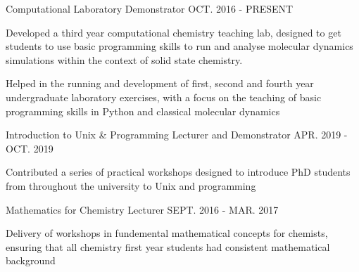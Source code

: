 \begin{cventries}
	\cventry
	{Computational Laboratory Demonstrator}
	{}
	{}
	{OCT. 2016 - PRESENT}
	{
		\begin{cvitems}
			\item {Developed a third year computational chemistry teaching lab, designed to get students to use basic programming skills to run and analyse molecular dynamics simulations within the context of solid state chemistry.}
			\item {Helped in the running and development of first, second and fourth year undergraduate laboratory exercises, with a focus on the teaching of basic programming skills in Python and classical molecular dynamics}
		\end{cvitems}
	}
	\cventry
	{Introduction to Unix \& Programming Lecturer and Demonstrator}
	{}
	{}
	{APR. 2019 - OCT. 2019}
	{
		\begin{cvitems}
			\item {Contributed a series of practical workshops designed to introduce PhD students from throughout the university to Unix and programming}
		\end{cvitems}
	}
	\cventry
	{Mathematics for Chemistry Lecturer}
	{}
	{}
	{SEPT. 2016 - MAR. 2017}
	{
		\begin{cvitems}
			\item {Delivery of workshops in fundemental mathematical concepts for chemists, ensuring that all chemistry first year students had consistent mathematical background}
		\end{cvitems}
	}\end{cventries}
